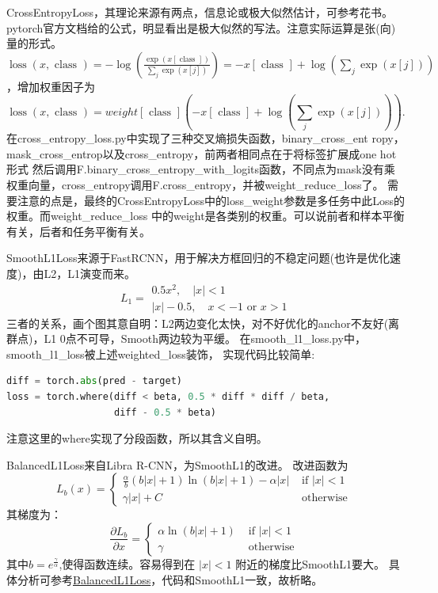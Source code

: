 \documentclass[UTF8]{ctexart}
\begin{document}
CrossEntropyLoss，其理论来源有两点，信息论或极大似然估计，可参考花书。
pytorch官方文档给的公式，明显看出是极大似然的写法。注意实际运算是张(向)量的形式。
$\operatorname{loss}(x, \text { class })=-\log \left(\frac{\exp (x[\text { class }])}{\sum_{j} \exp (x[j])}\right)=
-x[\text { class }]+\log \left(\sum_{j} \exp (x[j])\right)$，增加权重因子为
$$\operatorname{loss}(x, \text { class })=
w e i g h t[\text { class }]
\left(-x[\text { class }]+\log \left(\sum_{j} \exp (x[j])\right)\right).$$
在cross\_entropy\_loss.py中实现了三种交叉熵损失函数，binary\_cross\_ent
ropy， mask\_cross\_entrop以及cross\_entropy，前两者相同点在于将标签扩展成one hot形式
然后调用F.binary\_cross\_entropy\_with\_logits函数，不同点为mask没有乘权重向量，cross\_entropy调用F.cross\_entropy，并被weight\_reduce\_loss了。
需要注意的点是，最终的CrossEntropyLoss中的loss\_weight参数是多任务中此Loss的权重。而weight\_reduce\_loss
中的weight是各类别的权重。可以说前者和样本平衡有关，后者和任务平衡有关。

SmoothL1Loss来源于FastRCNN，用于解决方框回归的不稳定问题(也许是优化速度)，由L2，L1演变而来。
$$L_{1}=\begin{array}{l}
	0.5 x^{2}, \quad|x|<1 \\
	|x|-0.5, \quad x<-1 \text { or } x>1
	\end{array}$$
三者的关系，画个图其意自明：L2两边变化太快，对不好优化的anchor不友好(离群点)，L1 0点不可导，Smooth两边较为平缓。
在smooth\_l1\_loss.py中，smooth\_l1\_loss被上述weighted\_loss装饰，
实现代码比较简单:
\lstset{style=mystyle}
\begin{lstlisting}[language=Python]
diff = torch.abs(pred - target)
loss = torch.where(diff < beta, 0.5 * diff * diff / beta,
				   diff - 0.5 * beta)
\end{lstlisting}
注意这里的where实现了分段函数，所以其含义自明。

BalancedL1Loss来自Libra R-CNN，为SmoothL1的改进。
改进函数为
$$
L_{b}(x)=\left\{\begin{array}{ll}
	\frac{\alpha}{b}(b|x|+1) \ln (b|x|+1)-\alpha|x| & \text { if }|x|<1 \\
	\gamma|x|+C & \text { otherwise }
	\end{array}\right.
$$
其梯度为：
$$
\frac{\partial L_{b}}{\partial x}=\left\{\begin{array}{ll}
	\alpha \ln (b|x|+1) & \text { if }|x|<1 \\
	\gamma & \text { otherwise }
	\end{array}\right.
$$
其中$b=e^{\frac{\gamma}{\alpha}}$,使得函数连续。容易得到在 $|x|<1$ 附近的梯度比SmoothL1要大。
具体分析可参考\href{https://zhuanlan.zhihu.com/p/64541760}{BalancedL1Loss}，代码和SmoothL1一致，故析略。
\end{document}

